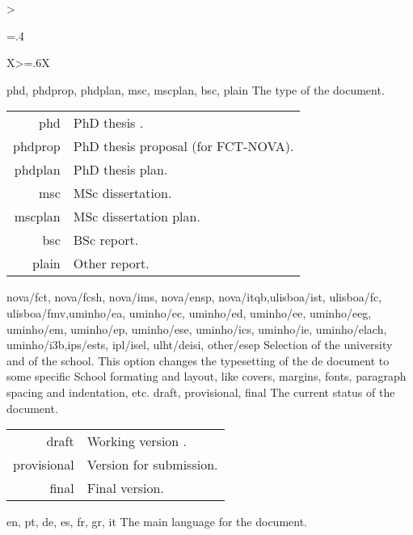 \bgroup
\begin{xltabular}{\linewidth}{>{\hsize=.4\hsize\raggedright\arraybackslash}X>{\hsize=.6\hsize}X}
  \toprule
    {phd, phdprop, phdplan, msc, mscplan, bsc, plain}%
    {The type of the document.}{
    \begin{tabular}{@{}r@{ $\rightarrow$ }l@{}}
        phd & PhD thesis .\\
    phdprop & PhD thesis proposal (for FCT-NOVA).\\
    phdplan & PhD thesis plan.\\
        msc & MSc dissertation.\\
    mscplan & MSc dissertation plan.\\
        bsc & BSc report.\\
      plain & Other report.\\
    \end{tabular}
    }
    \midrule
    {nova/fct, nova/fcsh, nova/ims, nova/ensp, nova/itqb,\newline ulisboa/ist, ulisboa/fc, ulisboa/fmv,\newline uminho/ea, uminho/ec, uminho/ed, uminho/ee, uminho/eeg, uminho/em, uminho/ep, uminho/ese, uminho/ics, uminho/ie, uminho/elach, uminho/i3b,\newline ips/ests, ipl/isel, ulht/deisi, other/esep}%
    {Selection of the university and of the school.}%
    { 
     This option changes the typesetting of the de document to some specific School formating and layout, like covers, margins, fonts, paragraph spacing and indentation, etc.}
    \midrule
    {draft, provisional, final}%
    {The current status of the document.}{
    \begin{tabular}{@{}r@{ $\rightarrow$ }X@{}}
         draft        & Working version .\\
         provisional  & Version for submission.\\
         final        & Final version.\\
    \end{tabular}
    }
    \midrule
    {en, pt, de, es, fr, gr, it}%
    {The main language for the document.}{
}
\end{xltabular}
